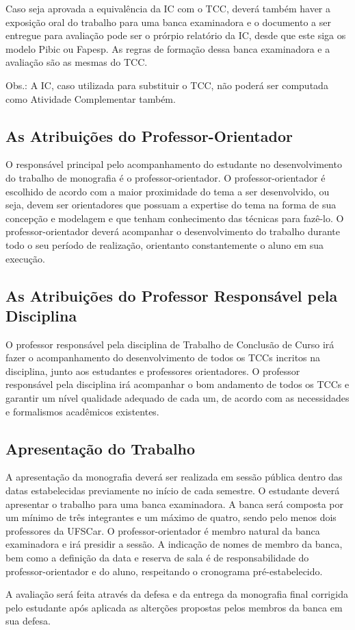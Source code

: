 Caso seja aprovada a equivalência da IC com o TCC, deverá também haver a exposição oral do trabalho para uma banca examinadora e o documento a ser entregue para avaliação pode ser o prórpio relatório da IC, desde que este siga os modelo Pibic ou Fapesp. As regras de formação dessa banca examinadora e a avaliação são as mesmas do TCC.

Obs.: A IC, caso utilizada para substituir o TCC, não poderá ser computada como Atividade Complementar também.


\subsection{As Atribuições do Professor-Orientador}

O responsável principal pelo acompanhamento do estudante no desenvolvimento do trabalho de monografia é o professor-orientador. O professor-orientador é escolhido de acordo com a maior proximidade do tema a ser desenvolvido, ou seja, devem ser orientadores que possuam a expertise do tema na forma de sua concepção e modelagem e que tenham conhecimento das técnicas para fazê-lo. O professor-orientador deverá acompanhar o desenvolvimento do trabalho durante todo o seu período de realização, orientanto constantemente o aluno em sua execução.

\subsection{As Atribuições do Professor Responsável pela Disciplina}

O professor responsável pela disciplina de Trabalho de Conclusão de Curso irá fazer o acompanhamento do desenvolvimento de todos os TCCs incritos na disciplina, junto aos estudantes e professores orientadores. O professor responsável pela disciplina irá acompanhar o bom andamento de todos os TCCs e garantir um nível qualidade adequado de cada um, de acordo com as necessidades e formalismos acadêmicos existentes.


\subsection{Apresentação do Trabalho}
A apresentação da monografia deverá ser realizada em sessão pública dentro das datas estabelecidas previamente no início de cada semestre. O estudante deverá apresentar o trabalho para uma banca examinadora. A banca será composta por um mínimo de três integrantes e um máximo de quatro, sendo pelo menos dois professores da UFSCar. O professor-orientador é membro natural da banca examinadora e irá presidir a sessão. A indicação de nomes de membro da banca, bem como a definição da data e reserva de sala é de responsabilidade do professor-orientador e do aluno, respeitando o cronograma pré-estabelecido.

A avaliação será feita através da defesa e da entrega da monografia final corrigida pelo estudante após aplicada as alterções propostas pelos membros da banca em sua defesa. 

